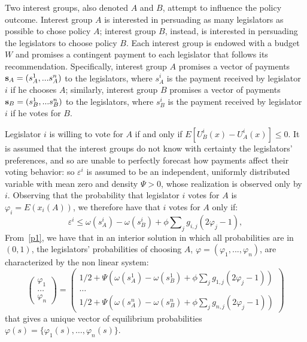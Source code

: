 \documentclass[nojss]{jss}
\begin{document}
Two interest groups, also denoted $A$ and $B$, attempt to influence the
policy outcome. Interest group $A$ is interested in persuading as many
legislators as possible to chose policy $A$; interest group $B$, instead, is
interested in persuading the legislators to choose policy $B$. Each interest
group is endowed with a budget $W$ and promises a contingent
payment to each legislator that follows its recommendation. Specifically,
interest group $A$ promises a vector of payments ${\bf s}_{A}=(s_{A}^{1},...s_{A}^{n})$ to the legislators, where $s_{A}^{i}$ is the
payment received by legislator $i$ if he chooses $A$; similarly, interest
group $B$ promises a vector of payments ${\bf s}_{B}=(s_{B}^{1},...s_{B}^{n}) $ to the legislators, where $s_{B}^{i}$ is the payment received by legislator $i$ if he votes for $B$.

Legislator $i$ is willing to vote for $A$ if and only if $E\left[
U_{B}^{i}(x)-U_{A}^{i}(x)\right] \leq 0$. It is assumed that the interest groups do not know with certainty the legislators' preferences, and so are unable to perfectly forecast how payments affect their voting behavior: so $\varepsilon ^{i}$ is assumed to be an independent, uniformly distributed variable with mean zero and density $\Psi >0$, whose realization is observed
only by $i$. Observing that the probability that legislator $i$ votes for $A$ is $\varphi _{i}=E(x_{i}(A))$, we therefore have that $i$ votes for $A$ only if:
\begin{equation}
	\varepsilon^{i}\leq \omega (s_{A}^{i})-\omega (s_{B}^{i})+\phi
	\sum\nolimits_{j}g_{i,j}\left( 2\varphi _{j}-1\right) ,  \label{p1}
\end{equation}%
From~\ref{p1}, we have that in an interior solution in which all probabilities are in $(0,1)$, the legislators' probabilities of choosing $A$, $\varphi =(\varphi _{1},...,\varphi _{n})$, are characterized by the non linear system:
\begin{equation}
	\left( 
	\begin{array}{c}
		\varphi _{1} \\ 
		\dots \\ 
		\varphi _{n}%
	\end{array}%
	\right) =\left( 
	\begin{array}{c}
		1/2+\Psi \left( \omega (s_{A}^{1})-\omega (s_{B}^{1})+\phi
		\sum\nolimits_{j}g_{1,j}\left( 2\varphi _{j}-1\right) \right) \\ 
		\dots \\ 
		1/2+\Psi \left( \omega (s_{A}^{n})-\omega (s_{B}^{n})+\phi
		\sum\nolimits_{j}g_{n,j}\left( 2\varphi _{j}-1\right) \right)%
	\end{array}%
	\right)  \label{sys1}
\end{equation}%
that gives a unique vector of equilibrium probabilities $\varphi
(s)=\{\varphi _{1}(s),\dots,\varphi _{n}(s)\}$.
\end{document}
